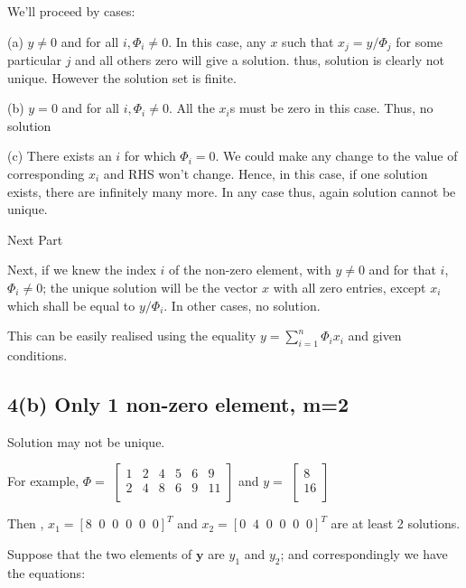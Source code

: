 \documentclass[fleqn, 11pt]{article}
\begin{document}
We'll proceed by cases:

(a) $y \neq 0$ and for all $i, \Phi_i \neq 0$. In this case, any $x$ such that 
$x_j = y/\Phi_j $ for some particular $j$ and all others zero will give a 
solution. thus, solution is clearly not unique. However the solution set 
is finite. 

(b) $y = 0$ and for all $i, \Phi_i \neq 0$. All the $x_i$s must be zero in 
this case. Thus, no solution

(c) There exists an $i$ for which $\Phi_i = 0$. We could make any change to 
the value of corresponding $x_i$ and RHS won't change. Hence, in this case, 
if one solution exists, there are infinitely many more. In any case thus, again 
solution cannot be unique. 

\bigskip 

{\textsf{Next Part}}

\medskip

Next, if we knew the index $i$ of the non-zero element, with $y \neq 0$
and for that $i$, $\Phi_i \neq 0$; the unique solution will be
the vector $x$ with all zero entries, except $x_i$ which shall be equal
to $y/ \Phi_i$. In other cases, no solution. 

This can be easily realised using the equality $y=\displaystyle \sum_{i=1}^{n} \Phi_i x_i$ and given conditions.


\subsection*{4(b) Only 1 non-zero element, m=2}


Solution may not be unique. 

For example, 
$ \Phi = $  $\begin{bmatrix}
    1 & 2 & 4 & 5 & 6 & 9\\
    2 & 4 & 8 & 6 & 9 & 11\\
    \end{bmatrix} $
  and  
$    y= $  $\begin{bmatrix}
    8 \\
    16 \\
    \end{bmatrix}$

Then ,      $x_1=[ 8 \;\;  0 \;\; 0 \;\; 0 \;\; 0 \;\; 0   ]^T $ and     
            $x_2=[ 0 \;\;  4 \;\; 0 \;\; 0 \;\; 0 \;\; 0 ]^T$ 
            are at least 2 solutions.




Suppose that the two elements of $\mathbf{y}$ are $y_1$ and $y_2$; 
and correspondingly we 
have the equations:
\end{document}
